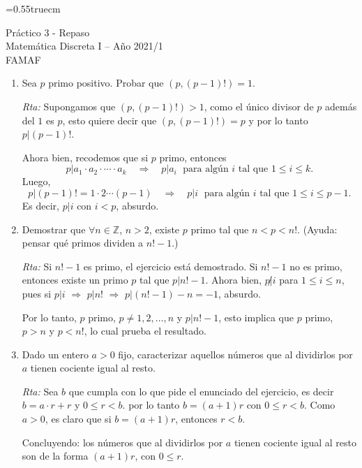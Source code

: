 \documentclass[a4paper,12pt,twoside,spanish,reqno]{amsbook}
\numberwithin{equation}{section}
\newcommand{\rta}{\noindent\textit{Rta: }}
\begin{document}
    \baselineskip=0.55truecm %

{\bf \begin{center} Práctico 3 - Repaso \\ Matemática Discreta I -- Año 2021/1 \\ FAMAF\end{center}}




\begin{enumerate}
\setlength\itemsep{1.1em}

\item Sea $p$ primo positivo. Probar que $(p,(p-1)!)=1$.

\rta Supongamos que  $(p,(p-1)!)>1$,  como el único divisor de $p$ además del $1$ es $p$, esto quiere decir que  $(p,(p-1)!)=p$ y por lo tanto $p|(p-1)!$.

Ahora bien, recodemos que si  $p$ primo, entonces
$$
p | a_1\cdot a_2 \cdot \cdots \cdot a_k \quad \Rightarrow\quad p| a_i \; \text{ para algún $i$ tal que $1 \le i \le k$}.
$$
Luego,
$$
p | (p-1)! = 1\cdot 2 \cdots (p-1) \quad \Rightarrow\quad p| i \; \text{ para algún $i$ tal que $1 \le i \le p-1$}.
$$
Es decir, $p|i$ con $i < p$, absurdo.


\item Demostrar que $\forall n\in{\mathbb Z}$, $n>2$, existe $p$ primo tal que $n<p<n!$. (Ayuda: pensar qué primos dividen a $n! - 1$.)

\rta Si $n! - 1$ es primo,  el ejercicio está demostrado. Si  $n! - 1$ no es primo, entonces existe un primo $p$ tal que $p| n! - 1$. Ahora bien, $p\not| i$ para $1 \le i \le n$, pues si $p|i$ $\Rightarrow$    $p| n!$  $\Rightarrow$  $p| (n! - 1) -n = -1$,  absurdo. 

Por lo tanto, $p$ primo, $p \ne 1,2, \ldots, n$ y  $p| n! - 1$,  esto implica que $p$ primo, $p > n$ y  $p <  n!$, lo cual prueba el resultado.



\item Dado un entero $a>0$ fijo, caracterizar aquellos números que al dividirlos por $a$ tienen cociente igual al resto.

\rta Sea $b$ que cumpla con lo que pide el enunciado del ejercicio, es decir $b = a \cdot r + r$ y $0 \le r < b$. por lo tanto  $b = (a+1) r$ con  $0 \le r < b$. Como $a>0$,  es claro que si $b=(a+1)r$,  entonces $r < b$. 

Concluyendo:  los  números que al dividirlos por $a$ tienen cociente igual al resto son de la forma $(a+1)r$,  con $0 \le r$. 



\end{enumerate}
\end{document}
